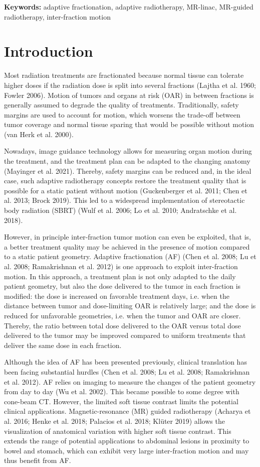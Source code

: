 \documentclass[11pt]{article}
\begin{document}
\noindent\textbf{Keywords:} adaptive fractionation, adaptive radiotherapy, MR-linac, MR-guided radiotherapy, inter-fraction motion

\section{Introduction}

Most radiation treatments are fractionated because normal tissue can tolerate higher doses if the radiation dose is split into several fractions (Lajtha et al. 1960; Fowler 2006). Motion of tumors and organs at risk (OAR) in between fractions is generally assumed to degrade the quality of treatments. Traditionally, safety margins are used to account for motion, which worsens the trade-off between tumor coverage and normal tissue sparing that would be possible without motion (van Herk et al. 2000).

Nowadays, image guidance technology allows for measuring organ motion during the treatment, and the treatment plan can be adapted to the changing anatomy (Mayinger et al. 2021). Thereby, safety margins can be reduced and, in the ideal case, such adaptive radiotherapy concepts restore the treatment quality that is possible for a static patient without motion (Guckenberger et al. 2011; Chen et al. 2013; Brock 2019). This led to a widespread implementation of stereotactic body radiation (SBRT) (Wulf et al. 2006; Lo et al. 2010; Andratschke et al. 2018).

However, in principle inter-fraction tumor motion can even be exploited, that is, a better treatment quality may be achieved in the presence of motion compared to a static patient geometry. Adaptive fractionation (AF) (Chen et al. 2008; Lu et al. 2008; Ramakrishnan et al. 2012) is one approach to exploit inter-fraction motion. In this approach, a treatment plan is not only adapted to the daily patient geometry, but also the dose delivered to the tumor in each fraction is modified: the dose is increased on favorable treatment days, i.e. when the distance between tumor and dose-limiting OAR is relatively large; and the dose is reduced for unfavorable geometries, i.e. when the tumor and OAR are closer. Thereby, the ratio between total dose delivered to the OAR versus total dose delivered to the tumor may be improved compared to uniform treatments that deliver the same dose in each fraction.

Although the idea of AF has been presented previously, clinical translation has been facing substantial hurdles (Chen et al. 2008; Lu et al. 2008; Ramakrishnan et al. 2012). AF relies on imaging to measure the changes of the patient geometry from day to day (Wu et al. 2002). This became possible to some degree with cone-beam CT. However, the limited soft tissue contrast limits the potential clinical applications. Magnetic-resonance (MR) guided radiotherapy (Acharya et al. 2016; Henke et al. 2018; Palacios et al. 2018; Kl\"uter 2019) allows the visualization of anatomical variation with higher soft tissue contrast. This extends the range of potential applications to abdominal lesions in proximity to bowel and stomach, which can exhibit very large inter-fraction motion and may thus benefit from AF.
\end{document}
